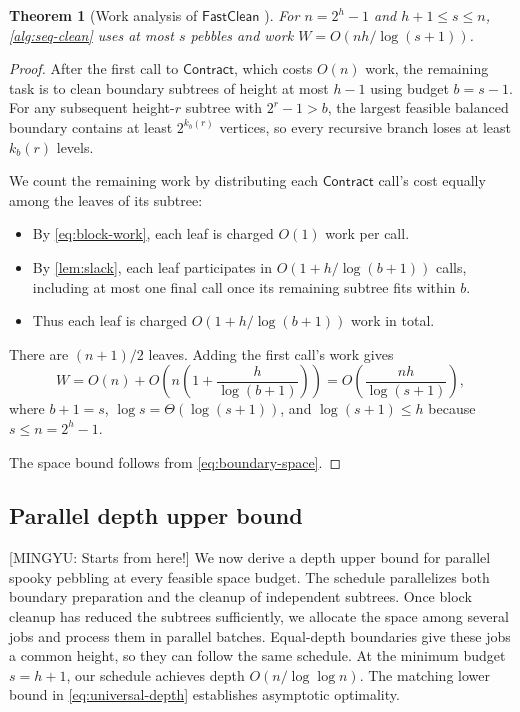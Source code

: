 \documentclass[11pt]{article}
\newtheorem{theorem}{Theorem}[section]
\theoremstyle{definition}
\theoremstyle{remark}
\newcommand{\Clean}{\mathsf{FastClean}}
\newcommand{\Contract}{\mathsf{Contract}}
\newcommand{\mingyu}[1]{{\color{magenta}\footnotesize [MINGYU: #1]}} %
\begin{document}
\begin{theorem}[Work analysis of $\Clean$ ]
\label{thm:seq-upper}
For $n=2^h-1$ and $h+1\le s\le n$, \cref{alg:seq-clean} uses at most $s$ pebbles and work $W=O(nh/\log(s+1))$.
\end{theorem}
\begin{proof}

After the first call to $\Contract$, which costs $O(n)$ work, the remaining task is to clean boundary subtrees of height at most $h-1$ using budget $b=s-1$. For any subsequent height-$r$ subtree with $2^r-1>b$, the largest feasible balanced boundary contains at least $2^{k_b(r)}$ vertices, so every recursive branch loses at least $k_b(r)$ levels.

We count the remaining work by distributing each $\Contract$ call's cost equally among the leaves of its subtree:
\begin{itemize}
    \item By \cref{eq:block-work}, each leaf is charged $O(1)$ work per call.
    \item By \cref{lem:slack}, each leaf participates in $O(1+h/\log(b+1))$ calls, including at most one final call once its remaining subtree fits within $b$.
    \item Thus each leaf is charged $O(1+h/\log(b+1))$ work in total.
\end{itemize}
There are $(n+1)/2$ leaves. Adding the first call's work gives
\[
W=O(n)+O\!\left(n\left(1+\frac{h}{\log(b+1)}\right)\right)
 =O\!\left(\frac{nh}{\log(s+1)}\right),
\]
where $b+1=s$, $\log s=\Theta(\log(s+1))$, and $\log(s+1)\le h$ because $s\le n=2^h-1$.

The space bound follows from \cref{eq:boundary-space}.

\end{proof}

\subsection{Parallel depth upper bound}
\label{sec:parallel-upper}

\mingyu{Starts from here!}
We now derive a depth upper bound for parallel spooky pebbling at every feasible space budget. The schedule parallelizes both boundary preparation and the cleanup of independent subtrees. Once block cleanup has reduced the subtrees sufficiently, we allocate the space among several jobs and process them in parallel batches. Equal-depth boundaries give these jobs a common height, so they can follow the same schedule.
At the minimum budget $s=h+1$, our schedule achieves depth $O(n/\log\log n)$. The matching lower bound in \cref{eq:universal-depth} establishes asymptotic optimality.
\end{document}
